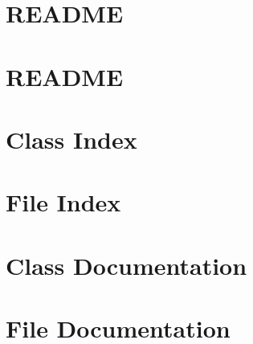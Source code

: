 \let\mypdfximage\pdfximage\def\pdfximage{\immediate\mypdfximage}\documentclass[twoside]{book}
\newcommand{\+}{\discretionary{\mbox{\scriptsize$\hookleftarrow$}}{}{}}
\newcommand{\clearemptydoublepage}{%
  \newpage{\pagestyle{empty}\cleardoublepage}%
}
\begin{document}
\chapter{README}
\label{md__home_deeishtay_Documents_Cpp_Monocular_Visual_Odometry_include_my_slam_basics_README}

\chapter{README}
\label{md__home_deeishtay_Documents_Cpp_Monocular_Visual_Odometry_include_my_slam_vo_README}

\chapter{Class Index}

\chapter{File Index}

\chapter{Class Documentation}









\chapter{File Documentation}



\backmatter
\newpage
{}
\clearemptydoublepage
{}
\printindex
\end{document}
